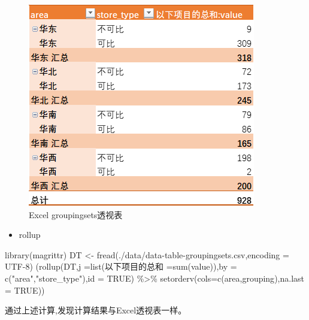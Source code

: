 \documentclass[
]{book}
\newenvironment{Shaded}{\begin{snugshade}}{\end{snugshade}}
\newcommand{\AttributeTok}[1]{\textcolor[rgb]{0.77,0.63,0.00}{#1}}
\newcommand{\ConstantTok}[1]{\textcolor[rgb]{0.00,0.00,0.00}{#1}}
\newcommand{\FunctionTok}[1]{\textcolor[rgb]{0.00,0.00,0.00}{#1}}
\newcommand{\NormalTok}[1]{#1}
\newcommand{\OtherTok}[1]{\textcolor[rgb]{0.56,0.35,0.01}{#1}}
\newcommand{\SpecialCharTok}[1]{\textcolor[rgb]{0.00,0.00,0.00}{#1}}
\newcommand{\StringTok}[1]{\textcolor[rgb]{0.31,0.60,0.02}{#1}}
\providecommand{\tightlist}{%
  \setlength{\itemsep}{0pt}\setlength{\parskip}{0pt}}
\begin{document}
\begin{figure}
\centering
\includegraphics{./picture/data-table/Excel-pivot-groupingsets.png}
\caption{Excel groupingsets透视表}
\end{figure}

\begin{itemize}
\tightlist
\item
  rollup
\end{itemize}

\begin{Shaded}
\begin{Highlighting}[]
\FunctionTok{library}\NormalTok{(magrittr)}
\NormalTok{DT }\OtherTok{\textless{}{-}} \FunctionTok{fread}\NormalTok{(}\StringTok{\textquotesingle{}./data/data{-}table{-}groupingsets.csv\textquotesingle{}}\NormalTok{,}\AttributeTok{encoding =} \StringTok{\textquotesingle{}UTF{-}8\textquotesingle{}}\NormalTok{)}
\NormalTok{(}\FunctionTok{rollup}\NormalTok{(DT,}\AttributeTok{j =}\FunctionTok{list}\NormalTok{(以下项目的总和 }\OtherTok{=}\FunctionTok{sum}\NormalTok{(value)),}\AttributeTok{by =} \FunctionTok{c}\NormalTok{(}\StringTok{"area"}\NormalTok{,}\StringTok{"store\_type"}\NormalTok{),}\AttributeTok{id =} \ConstantTok{TRUE}\NormalTok{) }\SpecialCharTok{\%\textgreater{}\%} \FunctionTok{setorderv}\NormalTok{(}\AttributeTok{cols=}\FunctionTok{c}\NormalTok{(}\StringTok{\textquotesingle{}area\textquotesingle{}}\NormalTok{,}\StringTok{\textquotesingle{}grouping\textquotesingle{}}\NormalTok{),}\AttributeTok{na.last =} \ConstantTok{TRUE}\NormalTok{))}
\end{Highlighting}
\end{Shaded}

通过上述计算,发现计算结果与Excel透视表一样。
\end{document}
